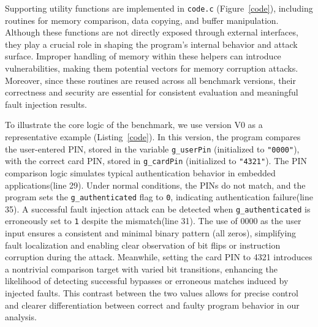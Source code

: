 Supporting utility functions are implemented in \texttt{code.c} (Figure~\ref{code}), including routines for memory comparison, data copying, and buffer manipulation. Although these functions are not directly exposed through external interfaces, they play a crucial role in shaping the program’s internal behavior and attack surface. Improper handling of memory within these helpers can introduce vulnerabilities, making them potential vectors for memory corruption attacks. Moreover, since these routines are reused across all benchmark versions, their correctness and security are essential for consistent evaluation and meaningful fault injection results.

To illustrate the core logic of the benchmark, we use version V0 as a representative example (Listing~\ref{code}). In this version, the program compares the user-entered PIN, stored in the variable \texttt{g\_userPin} (initialized to \texttt{"0000"}), with the correct card PIN, stored in \texttt{g\_cardPin} (initialized to \texttt{"4321"}). The PIN comparison logic simulates typical authentication behavior in embedded applications(line 29). Under normal conditions, the PINs do not match, and the program sets the \texttt{g\_authenticated} flag to \texttt{0}, indicating authentication failure(line 35). A successful fault injection attack can be detected when \texttt{g\_authenticated} is erroneously set to \texttt{1} despite the mismatch(line 31). The use of 0000 as the user input ensures a consistent and minimal binary pattern (all zeros), simplifying fault localization and enabling clear observation of bit flips or instruction corruption during the attack. Meanwhile, setting the card PIN to 4321 introduces a nontrivial comparison target with varied bit transitions, enhancing the likelihood of detecting successful bypasses or erroneous matches induced by injected faults. This contrast between the two values allows for precise control and clearer differentiation between correct and faulty program behavior in our analysis.

